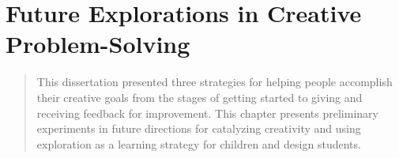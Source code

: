 \chapter{Future Explorations in Creative Problem-Solving}
\label{chapter:future}
\begin{quote}
   This dissertation presented three strategies for helping people accomplish their creative goals from the stages of getting started to giving and receiving feedback for improvement. This chapter presents preliminary experiments in future directions for catalyzing creativity and using exploration as a learning strategy for children and design students.
   
\end{quote}



